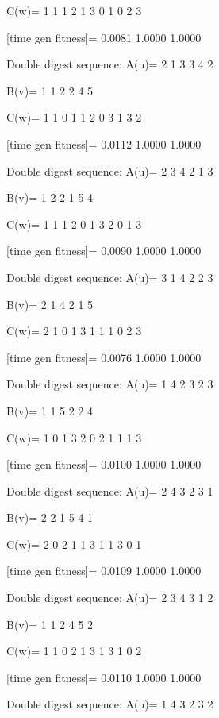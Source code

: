 C(w)=
     1     1     1     2     1     3     0     1     0     2     3

[time gen fitness]=
    0.0081    1.0000    1.0000

Double digest sequence:
A(u)=
     2     1     3     3     4     2

B(v)=
     1     1     2     2     4     5

C(w)=
     1     1     0     1     1     2     0     3     1     3     2

[time gen fitness]=
    0.0112    1.0000    1.0000

Double digest sequence:
A(u)=
     2     3     4     2     1     3

B(v)=
     1     2     2     1     5     4

C(w)=
     1     1     1     2     0     1     3     2     0     1     3

[time gen fitness]=
    0.0090    1.0000    1.0000

Double digest sequence:
A(u)=
     3     1     4     2     2     3

B(v)=
     2     1     4     2     1     5

C(w)=
     2     1     0     1     3     1     1     1     0     2     3

[time gen fitness]=
    0.0076    1.0000    1.0000

Double digest sequence:
A(u)=
     1     4     2     3     2     3

B(v)=
     1     1     5     2     2     4

C(w)=
     1     0     1     3     2     0     2     1     1     1     3

[time gen fitness]=
    0.0100    1.0000    1.0000

Double digest sequence:
A(u)=
     2     4     3     2     3     1

B(v)=
     2     2     1     5     4     1

C(w)=
     2     0     2     1     1     3     1     1     3     0     1

[time gen fitness]=
    0.0109    1.0000    1.0000

Double digest sequence:
A(u)=
     2     3     4     3     1     2

B(v)=
     1     1     2     4     5     2

C(w)=
     1     1     0     2     1     3     1     3     1     0     2

[time gen fitness]=
    0.0110    1.0000    1.0000

Double digest sequence:
A(u)=
     1     4     3     2     3     2

